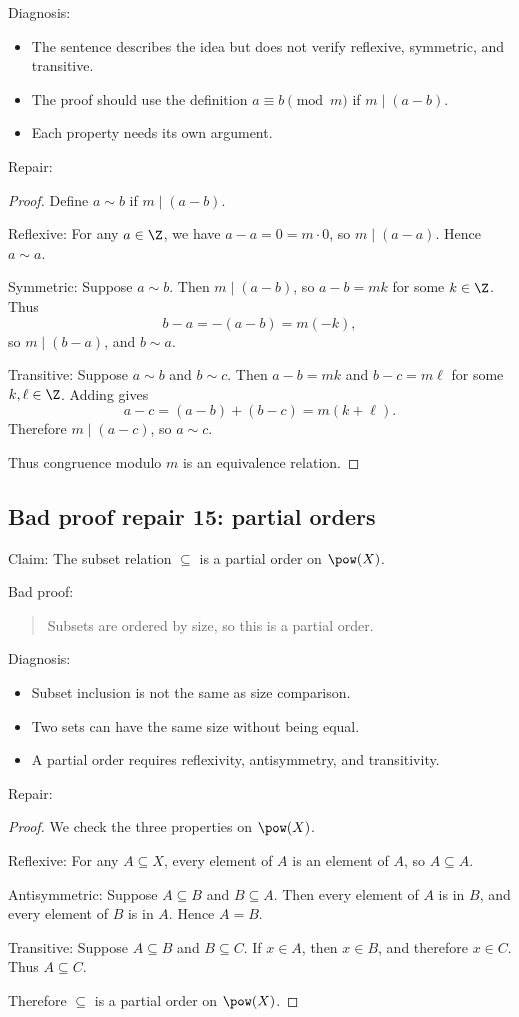 Diagnosis:

\begin{itemize}
\item The sentence describes the idea but does not verify reflexive, symmetric, and transitive.
\item The proof should use the definition $a\equiv b\pmod m$ if $m\mid(a-b)$.
\item Each property needs its own argument.
\end{itemize}

Repair:

\begin{proof}
Define $a\sim b$ if $m\mid(a-b)$.

Reflexive: For any $a\in\Z$, we have $a-a=0=m\cdot0$, so $m\mid(a-a)$. Hence $a\sim a$.

Symmetric: Suppose $a\sim b$. Then $m\mid(a-b)$, so $a-b=mk$ for some $k\in\Z$. Thus
\[
b-a=-(a-b)=m(-k),
\]
so $m\mid(b-a)$, and $b\sim a$.

Transitive: Suppose $a\sim b$ and $b\sim c$. Then $a-b=mk$ and $b-c=m\ell$ for some $k,\ell\in\Z$. Adding gives
\[
a-c=(a-b)+(b-c)=m(k+\ell).
\]
Therefore $m\mid(a-c)$, so $a\sim c$.

Thus congruence modulo $m$ is an equivalence relation.
\end{proof}

\subsection{Bad proof repair 15: partial orders}

Claim: The subset relation $\subseteq$ is a partial order on $\pow(X)$.

Bad proof:

\begin{quote}
Subsets are ordered by size, so this is a partial order.
\end{quote}

Diagnosis:

\begin{itemize}
\item Subset inclusion is not the same as size comparison.
\item Two sets can have the same size without being equal.
\item A partial order requires reflexivity, antisymmetry, and transitivity.
\end{itemize}

Repair:

\begin{proof}
We check the three properties on $\pow(X)$.

Reflexive: For any $A\subseteq X$, every element of $A$ is an element of $A$, so $A\subseteq A$.

Antisymmetric: Suppose $A\subseteq B$ and $B\subseteq A$. Then every element of $A$ is in $B$, and every element of $B$ is in $A$. Hence $A=B$.

Transitive: Suppose $A\subseteq B$ and $B\subseteq C$. If $x\in A$, then $x\in B$, and therefore $x\in C$. Thus $A\subseteq C$.

Therefore $\subseteq$ is a partial order on $\pow(X)$.
\end{proof}

